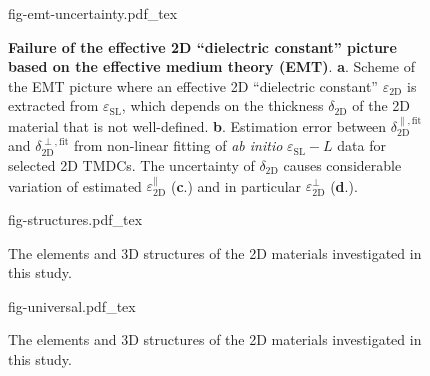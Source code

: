 \begin{figure}[!htbp]
  \centering
  {fig-emt-uncertainty.pdf_tex}
  \caption{\label{fig-emt}  \textbf{Failure of the effective 2D
      ``dielectric constant'' picture based on the effective medium
      theory (EMT)}. \textbf{a}.  Scheme of the EMT picture where an
    effective 2D ``dielectric constant'' $\varepsilon_{\mathrm{2D}}$
    is extracted from $\varepsilon_{\mathrm{SL}}$, which depends on
    the thickness $\delta_{\mathrm{2D}}$ of the 2D material that is
    not well-defined. \textbf{b}.  Estimation error between
    $\delta_{\mathrm{2D}}^{\parallel, \text{fit}}$ and
    $\delta_{\mathrm{2D}}^{\perp, \text{fit}}$ from non-linear fitting
    of \textit{ab initio} $\varepsilon_{\mathrm{SL}} - L$ data for selected
    2D TMDCs. The uncertainty of
    $\delta_{\mathrm{2D}}$ causes considerable variation of estimated
    $\varepsilon_{\mathrm{2D}}^{\parallel}$ (\textbf{c}.) and in
    particular $\varepsilon_{\mathrm{2D}}^{\perp}$ (\textbf{d}.).  }
\end{figure}

\begin{figure}[!htbp]
\centering
{fig-structures.pdf_tex}
\caption{\label{fig:diel-struct}
  The elements and 3D structures of the 2D
  materials investigated in this study.}
\end{figure}

\begin{figure}[!htbp]
\centering
{fig-universal.pdf_tex}
\caption{\label{fig:diel-universal}
  The elements and 3D structures of the 2D
  materials investigated in this study.}
\end{figure}

